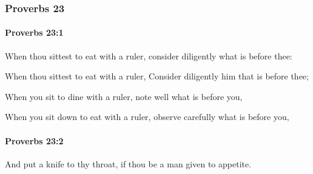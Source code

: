 	\subsubsection{Proverbs 23} %
		\label{PROVERBS-23}

		\paragraph{Proverbs 23:1} %
			\label{PROVERBS-23-1}

			When thou sittest to eat with a ruler, consider diligently what is before thee:

			\begin{versebox}
					\item[BHS] 
					\item[ASV] When thou sittest to eat with a ruler, Consider diligently him that is before thee;
					\item[NIV] When you sit to dine with a ruler, note well what is before you,
					\item[NRSV] When you sit down to eat with a ruler, observe carefully what is before you,
			\end{versebox}

		\paragraph{Proverbs 23:2} %
			\label{PROVERBS-23-2}

			And put a knife to thy throat, if thou be a man given to appetite.

